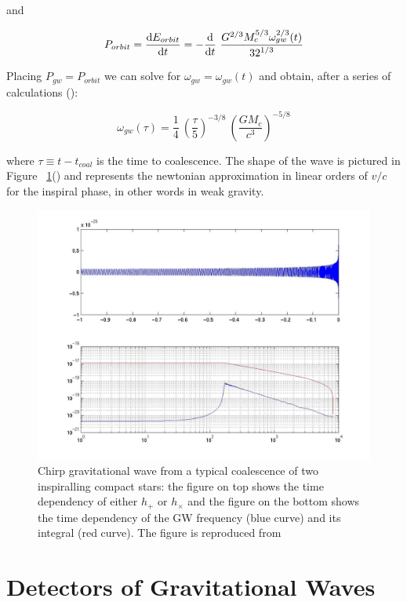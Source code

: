 \documentclass[epsf]{article}
\begin{document}
and

\begin{equation}
P_{orbit} = \frac {{\rm d}E_{orbit}}{{\rm d}t} = - \frac {{\rm d}}{{\rm d}t}~ \frac{G^{2/3}M_c^{5/3}\omega_{gw}^{2/3}(t)}{{32}^{1/3}}
\end{equation}

Placing $P_{gw} = P_{orbit}$ we can solve for $\omega_{gw}=\omega_{gw}(t)$ and obtain, after a series of calculations (\cite{maggiore,ian}):

\begin{equation}
\boxed{\omega_{gw}(\tau) = \frac {1}{4}~\left({\frac {\tau}{5}}\right)^{-3/8}~ \left({\frac{GM_c}{c^3}}\right)^{-5/8}}
\end{equation}

where $\tau \equiv t-t_{coal}$ is the time to coalescence. The shape of the wave is pictured in Figure ~\ref{fig:chirp}(\cite{ligoweb}) and represents the newtonian approximation in linear orders of $v/c$ for the inspiral phase, in other words in weak gravity.  

\begin{figure}[ht]
\centering
\includegraphics[scale=0.25]{chirpfreq.jpg}
\caption{Chirp gravitational wave from a typical coalescence of two inspiralling compact stars: the figure on top shows the time dependency of either $h_+$ or $h_{\times}$ and the figure on the bottom shows the time dependency of the GW frequency (blue curve) and its integral (red curve). The figure is reproduced from \cite{ligoweb}}
\label{fig:chirp}
\end{figure}

\section{Detectors of Gravitational Waves}
\end{document}
